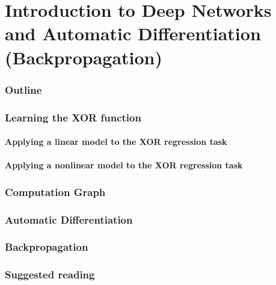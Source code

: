 \renewcommand{\thispart}{3}
\renewcommand{\thispartname}{Introduction to Deep Networks and Automatic Differentiation (Backpropagation)}

\part{\thispartname}



\section{Outline}


\section{Learning the XOR function}

\subsection{Applying a linear model to the XOR regression task}

\subsection{Applying a nonlinear model to the XOR regression task}


\section{Computation Graph}



\section{Automatic Differentiation}







\section{Backpropagation}

\section{Suggested reading}



